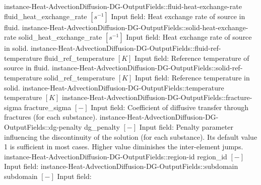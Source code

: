 \begin{SelectionType}
{{}}
		\SelectionItem
			{instance-Heat-AdvectionDiffusion-DG-OutputFields::fluid-heat-exchange-rate}
			{fluid{\_}heat{\_}exchange{\_}rate}
			{{{}{$[s^{-1}]$}{ Input field: Heat exchange rate of source in fluid.}%
}}
		\SelectionItem
			{instance-Heat-AdvectionDiffusion-DG-OutputFields::solid-heat-exchange-rate}
			{solid{\_}heat{\_}exchange{\_}rate}
			{{{}{$[s^{-1}]$}{ Input field: Heat exchange rate of source in solid.}%
}}
		\SelectionItem
			{instance-Heat-AdvectionDiffusion-DG-OutputFields::fluid-ref-temperature}
			{fluid{\_}ref{\_}temperature}
			{{{}{$[K]$}{ Input field: Reference temperature of source in fluid.}%
}}
		\SelectionItem
			{instance-Heat-AdvectionDiffusion-DG-OutputFields::solid-ref-temperature}
			{solid{\_}ref{\_}temperature}
			{{{}{$[K]$}{ Input field: Reference temperature in solid.}%
}}
		\SelectionItem
			{instance-Heat-AdvectionDiffusion-DG-OutputFields::temperature}
			{temperature}
			{{{}{$[K]$}{ }%
}}
		\SelectionItem
			{instance-Heat-AdvectionDiffusion-DG-OutputFields::fracture-sigma}
			{fracture{\_}sigma}
			{{{}{$[-]$}{ Input field: Coefficient of diffusive transfer through fractures (for each substance).}%
}}
		\SelectionItem
			{instance-Heat-AdvectionDiffusion-DG-OutputFields::dg-penalty}
			{dg{\_}penalty}
			{{{}{$[-]$}{ Input field: Penalty parameter influencing the discontinuity of the solution (for each substance). Its default value 1 is sufficient in most cases.
Higher value diminishes the inter-element jumps.}%
}}
		\SelectionItem
			{instance-Heat-AdvectionDiffusion-DG-OutputFields::region-id}
			{region{\_}id}
			{{{}{$[-]$}{ Input field: }%
}}
		\SelectionItem
			{instance-Heat-AdvectionDiffusion-DG-OutputFields::subdomain}
			{subdomain}
			{{{}{$[-]$}{ Input field: }%
}}
\end{SelectionType}
